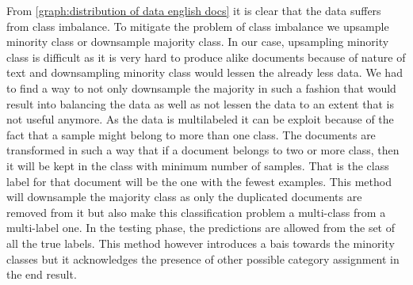 From \ref{graph:distribution of data english docs} it is clear that the data suffers from class imbalance. To mitigate the problem of class imbalance we upsample minority class or downsample majority class. In our case, upsampling minority class is difficult as it is very hard to produce alike documents because of nature of text and downsampling minority class would lessen the already less data. We had to find a way to not only downsample the majority in such a fashion that would result into balancing the data as well as not lessen the data to an extent that is not useful anymore.
As the data is multilabeled it can be exploit because of the fact that a sample might belong to more than one class. The documents are transformed in such a way that if a document belongs to two or more class, then it will be kept in the class with minimum number of samples. That is the class label for that document will be the one with the fewest examples. This method will downsample the majority class as only the duplicated documents are removed from it but also make this classification problem a multi-class from a multi-label one. In the testing phase, the predictions are allowed from the set of all the true labels. This method however introduces a bais towards the minority classes but it acknowledges the presence of other possible category assignment in the end result.

